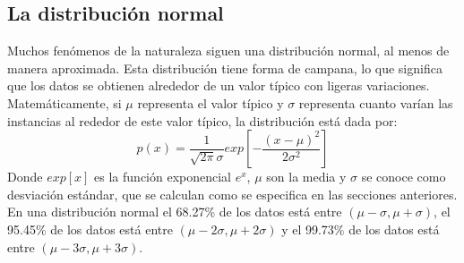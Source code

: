 \documentclass[a4paper, 11pt, oneside]{report}
\begin{document}
\subsection{La distribución normal}
Muchos fenómenos de la naturaleza siguen una distribución normal, al menos de manera aproximada. Esta distribución tiene forma de campana, lo que significa que los datos se obtienen alrededor de un valor típico con ligeras variaciones. Matemáticamente, si $\mu$ representa el valor típico y $\sigma$ representa cuanto varían las instancias al rededor de este valor típico, la distribución está dada por:
\begin{equation}
p(x) = \frac{1}{\sqrt{2\pi}\sigma}exp\left[-\frac{(x-\mu)^2}{2\sigma^2}\right]
\label{eq:normal}
\end{equation}
Donde $exp[x]$ es la función exponencial $e^x$, $\mu$ son la media y $\sigma$ se conoce como desviación estándar, que se calculan como se especifica en las secciones anteriores. En una distribución normal el 68.27\% de los datos está entre $(\mu-\sigma, \mu+\sigma)$, el 95.45\% de los datos está entre $(\mu-2\sigma, \mu+2\sigma)$ y el 99.73\% de los datos está entre $(\mu-3\sigma, \mu+3\sigma)$.
\end{document}
